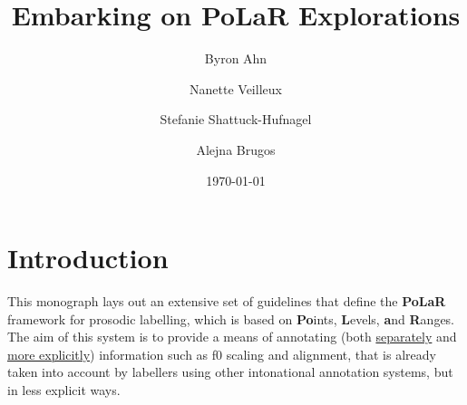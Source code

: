 \documentclass[11pt, twoside]{memoir}
\def\THIStitle{Embarking on PoLaR Explorations}
\def\THISsubtitle{A Framework for Intonational Annotation and Analysis}
\begin{document}
\frontmatter
{}

\title{\THIStitle}
\author{Byron Ahn \and Nanette Veilleux \and Stefanie Shattuck-Hufnagel \and Alejna Brugos}
\date{\today}


\tableofcontents
\newpage
\listoffigures
\listoftables
\newpage

\mainmatter

\section*{Introduction}\label{sec:introduction}

\setcounter{footnote}{0}
\renewcommand*{\thefootnote}{\fnsymbol{footnote}}

This monograph lays out an extensive set of guidelines that define the \textbf{PoLaR} framework for prosodic labelling, which is based on \textbf{Po}ints, \textbf{L}evels, \textbf{a}nd \textbf{R}anges.  The aim of this system is to provide a means of annotating (both \uline{separately} and \uline{more explicitly}) information such as f0 scaling and alignment, that is already taken into account by labellers using other intonational annotation systems, but in less explicit ways.
\end{document}
